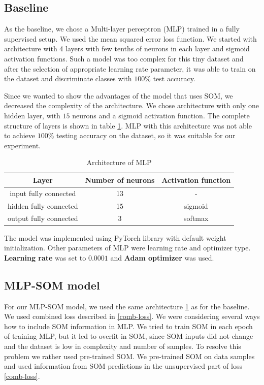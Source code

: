 \subsection{Baseline}
\label{sup-baseline}
As the baseline, we chose a Multi-layer perceptron (MLP) trained in a fully supervised setup. We used the mean squared error loss function. We started with architecture with 4 layers with few tenths of neurons in each layer and sigmoid activation functions. Such a model was too complex for this tiny dataset and after the selection of appropriate learning rate parameter, it was able to train on the dataset and discriminate classes with $100\%$ test accuracy. 

Since we wanted to show the advantages of the model that uses SOM, we decreased the complexity of the architecture. We chose architecture with only one hidden layer, with $15$ neurons and a sigmoid activation function. The complete structure of layers is shown in table \ref{mlp=layers}. MLP with this architecture was not able to achieve $100\%$ testing accuracy on the dataset, so it was suitable for our experiment.


\begin{table}[ht]
    \centering
    \begin{tabular}{ |c|c|c|} 
     \hline
            Layer & Number of neurons & Activation function\\
            \hline
            input fully connected & 13 &  - \\
            hidden fully connected & 15 & sigmoid  \\
            output fully connected  & 3 & softmax \\
     \hline
    \end{tabular}
    \caption{Architecture of MLP}
    \label{mlp=layers}
\end{table}

The model was implemented using PyTorch library \cite{pytorch} with default weight initialization.
Other parameters of MLP were learning rate and optimizer type. \textbf{Learning rate} was set to $0.0001$ and \textbf{Adam optimizer} was used. 




\subsection{MLP-SOM model}
For our MLP-SOM model, we used the same architecture \ref{mlp=layers} as for the baseline. We used combined loss described in \ref{comb-loss}. We were considering several ways how to include SOM information in MLP. We tried to train SOM in each epoch of training MLP, but it led to overfit in SOM, since SOM inputs did not change and the dataset is low in complexity and number of samples. To resolve this problem we rather used pre-trained SOM. We pre-trained SOM on data samples and used information from SOM predictions in the unsupervised part of loss \ref{comb-loss}. 


